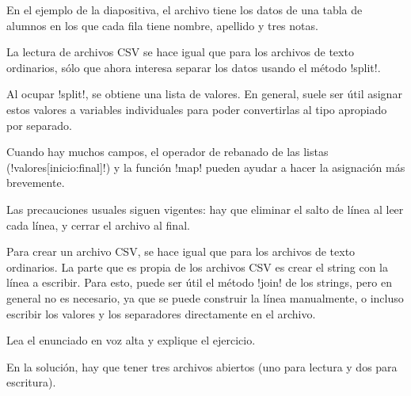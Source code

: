\documentclass[10pt]{article}
\begin{document}
  En el ejemplo de la diapositiva,
  el archivo tiene los datos de una tabla de alumnos
  en los que cada fila tiene nombre, apellido y tres notas.


  La lectura de archivos CSV se hace igual que para los archivos de texto ordinarios,
  sólo que ahora interesa separar los datos usando el método \li!split!.

  Al ocupar \li!split!, se obtiene una lista de valores.
  En general, suele ser útil asignar estos valores a variables individuales
  para poder convertirlas al tipo apropiado por separado.

  Cuando hay muchos campos,
  el operador de rebanado de las listas (\li!valores[inicio:final]!)
  y la función \li!map!
  pueden ayudar a hacer la asignación más brevemente.

  Las precauciones usuales siguen vigentes:
  hay que eliminar el salto de línea al leer cada línea,
  y cerrar el archivo al final.


  Para crear un archivo CSV,
  se hace igual que para los archivos de texto ordinarios.
  La parte que es propia de los archivos CSV
  es crear el string con la línea a escribir.
  Para esto, puede ser útil el método \li!join! de los strings,
  pero en general no es necesario,
  ya que se puede construir la línea manualmente,
  o incluso escribir los valores y los separadores
  directamente en el archivo.


  Lea el enunciado en voz alta y explique el ejercicio.

  En la solución,
  hay que tener tres archivos abiertos (uno para lectura y dos para escritura).
\end{document}
